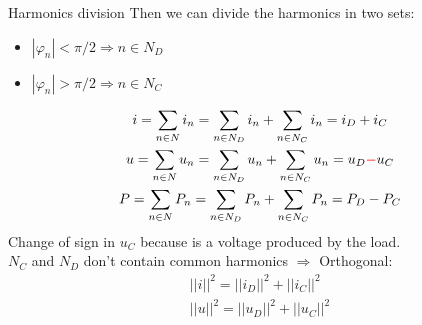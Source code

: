 \documentclass[aspectratio=169]{beamer}
\begin{document}
\begin{frame}{Harmonics division}{\insertsection}
    Then we can divide the harmonics in two sets:
    \begin{itemize}
      \item $|\varphi_n|<\pi/2 \Rightarrow n\in N_D$ 
      \item $|\varphi_n| >\pi/2 \Rightarrow n\in N_C$ 
    \end{itemize}
    \begin{gather}
      i=\sum_{n\in N}i_n = \sum_{n \in N_D}i_n + \sum_{n \in N_C}i_n = i_D+i_C\\
      u=\sum_{n\in N}u_n = \sum_{n \in N_D}u_n + \sum_{n \in N_C}u_n = u_D \textcolor{red}{-}u_C\\
      P=\sum_{n\in N}P_n = \sum_{n \in N_D}P_n + \sum_{n \in N_C}P_n = P_D - P_C
    \end{gather}
    Change of sign in $u_C$ because is a voltage produced by the load.\\
    $N_C$ and $N_D$ don't contain common harmonics $\Rightarrow$ Orthogonal: 
    \begin{gather}
        ||i||^2=||i_D||^2+||i_C||^2\\
        ||u||^2=||u_D||^2+||u_C||^2\\
    \end{gather}
  \end{frame}
  
\end{document}

